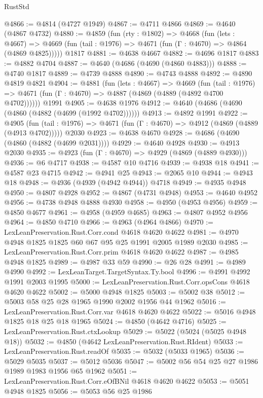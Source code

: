 \begin{lexlean}{RustStd}
\begin{coremodule}
@4866 := @4814 (@4727 @1949)
@4867 := @4711 @4866
@4869 := @4640 (@4867 @4732)
@4880 := @4859
    (fun (rty : @1802) =>
    @4668
      (fun (lets : @4667) =>
      @4669 (fun (tail : @1976) => @4671 (fun (Γ : @4670) => @4864 (@4869 @4825)))))
    @1817
@4881 := @4638 @4667
@4882 := @4696 @1817
@4883 := @4882 @4704
@4887 := @4640 (@4686 (@4690 (@4860 @4883)))
@4888 := @4740 @1817
@4889 := @4739 @4888
@4890 := @4743 @4888
@4892 := @4890 @4819 @4821
@4904 := @4881
    (fun (lets : @4667) =>
    @4669
      (fun (tail : @1976) => @4671 (fun (Γ : @4670) => @4887 (@4869 (@4889 (@4892 @4700 @4702))))))
    @1991
@4905 := @4638 @1976
@4912 := @4640 (@4686 (@4690 (@4860 (@4882 (@4699 (@1992 @4702))))))
@4913 := @4892 @1991
@4922 := @4905
    (fun (tail : @1976) => @4671 (fun (Γ : @4670) => @4912 (@4869 (@4889 (@4913 @4702)))))
    @2030
@4923 := @4638 @4670
@4928 := @4686 (@4690 (@4860 (@4882 (@4699 @2031))))
@4929 := @4640 @4928
@4930 := @4913 @2030
@4935 := @4923 (fun (Γ : @4670) => @4929 (@4869 (@4889 @4930)))
@4936 := @6 @4717
@4938 := @4587 @10 @4716
@4939 := @4938 @18
@4941 := @4587 @23 @4715
@4942 := @4941 @25
@4943 := @2065 @10
@4944 := @4943 @18
@4948 := @4936 (@4939 (@4942 @4944)) @4718
@4949 := @4935 @4948
@4950 := @4807 @4928
@4952 := @4867 (@4731 @4948)
@4953 := @4640 @4952
@4956 := @4738 @4948 @4888 @4930
@4958 := @4950 (@4953 @4956)
@4959 := @4850 @4677
@4961 := @4958 (@4959 @4685)
@4963 := @4807 @4952 @4956
@4964 := @4850 @4710
@4966 := @4963 (@4964 @4866)
@4970 := LexLeanPreservation.Rust.Corr.cond @4618 @4620 @4622
@4981 := @4970 @4948 @1825 @1825 @60 @67 @95 @25 @1991 @2005 @1989 @2030
@4985 := LexLeanPreservation.Rust.Corr.prim @4618 @4620 @4622
@4987 := @4985 @4948 @1825
@4989 := @4987 @33 @59
@4990 := @26 @28
@4991 := @4989 @4990
@4992 := LexLeanTarget.TargetSyntax.Ty.bool
@4996 := @4991 @4992 @1991 @2003 @1995
@5000 := LexLeanPreservation.Rust.Corr.opsCons @4618 @4620 @4622
@5002 := @5000 @4948 @1825
@5003 := @5002 @38
@5012 := @5003 @58 @25 @28 @1965 @1990 @2002 @1956 @44 @1962
@5016 := LexLeanPreservation.Rust.Corr.var @4618 @4620 @4622
@5022 := @5016 @4948 @1825 @18 @25 @18 @1965
@5024 := @4850 (@4642 @4716)
@5025 := LexLeanPreservation.Rust.ctxLookup
@5029 := @5022 (@5024 (@5025 @4948 @18))
@5032 := @4850 (@4642 LexLeanPreservation.Rust.RIdent)
@5033 := LexLeanPreservation.Rust.readOf
@5035 := @5032 (@5033 @1965)
@5036 := @5029 @5035
@5037 := @5012 @5036
@5047 := @5002 @56 @54 @25 @27 @1986 @1989 @1983 @1956 @65 @1962
@5051 := LexLeanPreservation.Rust.Corr.eOfBNil @4618 @4620 @4622
@5053 := @5051 @4948 @1825
@5056 := @5053 @56 @25 @1986

\end{coremodule}
\end{lexlean}
